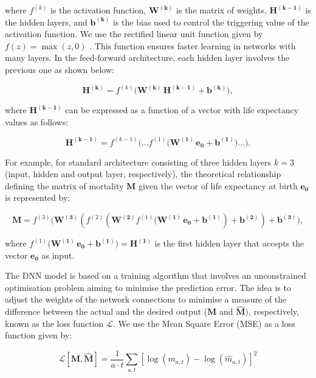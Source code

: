 \documentclass[a4,11pt]{article}
\begin{document}
where $f^{(k)}$ is the activation function, $\mathbf{W^{(k)}}$ is the matrix of weights, $\mathbf{H^{(k-1)}}$ is the hidden layers, and $\mathbf{b^{(k)}}$ is the bias used to control the triggering value of the activation function. We use the rectified linear unit function given by $f(z)= \max(z, 0)$ \citep{Glorot}. This function ensures faster learning in networks with many layers. In the feed-forward architecture, each hidden layer involves the previous one as shown below:

%
\begin{equation*}
\mathbf{H^{(k)}}=f^{(k)}\big(\mathbf{W^{(k)}}\,\mathbf{H^{(k-1)}}+\mathbf{b^{(k)}}\big),
\end{equation*}
%

where $\mathbf{H^{(k-1)}}$ can be expressed as a function of a vector with life expectancy values as follows:

%
\begin{equation*}
\mathbf{H^{(k-1)}} = f^{(k-1)} \big(\dots f^{(1)}\big(\mathbf{W^{(1)}}\,\mathbf{e_{0}}+\mathbf{b^{(1)}}\big)\dots\big).
\end{equation*}
%

For example, for standard architecture consisting of three hidden layers $k=3$ (input, hidden and output layer, respectively), the theoretical relationship defining the matrix of mortality $\mathbf{M}$ given the vector of life expectancy at birth $\mathbf{e_{0}}$ is represented by:

%
\begin{equation}
\label{eq:2}
\mathbf{M}= f^{(3)} \big(\mathbf{W^{(3)}}(f^{(2)}(\mathbf{W^{(2)}}f^{(1)}\big(\mathbf{W^{(1)}}\,\mathbf{e_{0}}+\mathbf{b^{(1)}})+\mathbf{b^{(2)}})+\mathbf{b^{(3)}}),
\end{equation}
%

where $f^{(1)}\big(\mathbf{W^{(1)}}\,\mathbf{e_{0}}+\mathbf{b^{(1)}}\big) = \mathbf{H^{(1)}}$ is the first hidden layer that accepts the vector $\mathbf{e_{0}}$ as input. 

The DNN model is based on a training algorithm that involves an unconstrained optimisation problem aiming to minimise the prediction error. The idea is to adjust the weights of the network connections to minimise a measure of the difference between the actual and the desired output ($\mathbf{M}$ and $\mathbf{\hat{M}})$, respectively, known as the loss function $\mathcal{L}$. We use the Mean Square Error (MSE) as a loss function given by:

%
$$\mathcal{L}[\mathbf{M},\mathbf{\hat{M}}] = \frac{1}{a \cdot t}\sum_{a,t}\left[\log({m_{a,t}})- \log({\hat{m}_{a,t}})\right]^2$$
%
\end{document}
